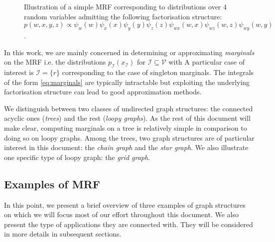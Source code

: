 \begin{figure}[!h]
\center
{}
\caption{\label{fig:simple-MRF}Illustration of a simple MRF corresponding to distributions over 4 random variables admitting the following factorisation structure:\\ $p(w,x,y,z)\propto \psi_{w}(w)\psi_{x}(x)\psi_{y}(y)\psi_{z}(z)\psi_{wx}(w,x)\psi_{wz}(w,z)\psi_{wy}(w,y)$.}
\end{figure}
In this work, we are mainly concerned in determining or approximating  \emph{marginals} on the MRF i.e. the distributions $p_{\mathcal I}(x_{\mathcal I})$ for $\mathcal I\subseteq\mathcal V$  with
A particular case of interest is $\mathcal I=\{r\}$ corresponding to the case of singleton marginals. The integrals of the form \eqref{eq:marginals} are typically intractable but exploiting the underlying factorisation structure can lead to good approximation methods.

We distinguish between two classes of undirected graph structures: the connected acyclic ones (\emph{trees}) and the rest (\emph{loopy graphs}). As the rest of this document will make clear, computing marginals on a tree is relatively simple in comparison to doing so on loopy graphs. 
Among the trees, two graph structures are of particular interest in this document: the \emph{chain graph} and the \emph{star graph}. 
We also illustrate one specific type of loopy graph: the \emph{grid graph}.


\subsection{Examples of MRF}
In this point, we present a brief overview of three examples of graph structures on which we will focus most of our effort throughout this document. 
We also present the type of applications they are connected with. 
They will be considered in more details in subsequent sections.

